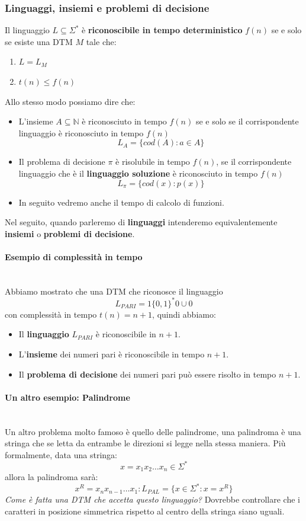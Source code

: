 \documentclass{article}
\begin{document}
\subsubsection{Linguaggi, insiemi e problemi di decisione}
Il linguaggio $L\subseteq\Sigma^*$ è \textbf{riconoscibile in tempo
deterministico} $f(n)$ se e solo se esiste una DTM $M$ tale che:
\begin{enumerate}
    \item $L=L_M$
    \item $t(n)\leq f(n)$
\end{enumerate}
Allo stesso modo possiamo dire che:
\begin{itemize}
    \item L'insieme $A\subseteq\mathbb{N}$ è riconosciuto in tempo $f(n)$
          se e solo se il corrispondente linguaggio è riconosciuto in tempo $f(n)$
          $$L_A=\{cod(A):a\in A\}$$
    \item Il problema di decisione $\pi$ è risolubile in tempo $f(n)$, se
          il corrispondente linguaggio che è il \textbf{linguaggio soluzione} è riconosciuto
          in tempo $f(n)$
          $$L_\pi=\{cod(x):p(x)\}$$
    \item In seguito vedremo anche il tempo di calcolo di funzioni.
\end{itemize}
Nel seguito, quando parleremo di \textbf{linguaggi} intenderemo equivalentemente \textbf{insiemi}
o \textbf{problemi di decisione}.

\paragraph{Esempio di complessità in tempo}\mbox{}\\
Abbiamo mostrato che una DTM che riconosce il linguaggio $$L_{PARI}=1\{0,1\}^*0\cup0$$
con complessità in tempo $t(n)=n+1$, quindi abbiamo:
\begin{itemize}
    \item Il \textbf{linguaggio} $L_{PARI}$ è riconoscibile in $n+1$.
    \item L'\textbf{insieme} dei numeri pari è riconoscibile in tempo $n+1$.
    \item Il \textbf{problema di decisione} dei numeri pari può essere risolto in tempo $n+1$.
\end{itemize}

\paragraph{Un altro esempio: Palindrome}\mbox{}\\
Un altro problema molto famoso è quello delle palindrome,
una palindroma è una stringa che se letta da entrambe le direzioni
si legge nella stessa maniera. Più formalmente, data una stringa:
$$x=x_1 x_2\dots x_n\in\Sigma^*$$ allora la palindroma sarà:
$$x^R=x_n x_{n-1}\dots x_1 : L_{PAL}=\{x\in\Sigma^*:x=x^R\}$$
\textit{Come è fatta una DTM che accetta questo linguaggio?} Dovrebbe
controllare che i caratteri in posizione simmetrica rispetto al centro
della stringa siano uguali.
\end{document}
